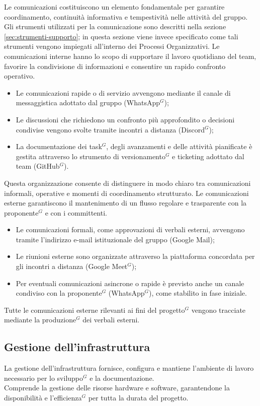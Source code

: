 Le comunicazioni costituiscono un elemento fondamentale per garantire coordinamento, continuità informativa e tempestività nelle attività del gruppo. Gli strumenti utilizzati per la comunicazione sono descritti nella sezione \ref{sec:strumenti-supporto}; in questa sezione viene invece specificato come tali strumenti vengono impiegati all’interno dei Processi Organizzativi.
Le comunicazioni interne hanno lo scopo di supportare il lavoro quotidiano del team, favorire la condivisione di informazioni e consentire un rapido confronto operativo.
\begin{itemize}[itemsep=3pt, parsep=1pt, label=$\scriptstyle\bullet$]
    \item Le comunicazioni rapide o di servizio avvengono mediante il canale di messaggistica adottato dal gruppo (WhatsApp$^G$);
    \item Le discussioni che richiedono un confronto più approfondito o decisioni condivise vengono svolte tramite incontri a distanza (Discord$^G$);
    \item La documentazione dei task$^G$, degli avanzamenti e delle attività pianificate è gestita attraverso lo strumento di versionamento$^G$ e ticketing adottato dal team (GitHub$^G$).
\end{itemize}
Questa organizzazione consente di distinguere in modo chiaro tra comunicazioni informali, operative e momenti di coordinamento strutturato.
Le comunicazioni esterne garantiscono il mantenimento di un flusso regolare e trasparente con la proponente$^G$ e con i committenti.
\begin{itemize}[itemsep=3pt, parsep=1pt, label=$\scriptstyle\bullet$]
    \item Le comunicazioni formali, come approvazioni di verbali esterni, avvengono tramite l’indirizzo e-mail istituzionale del gruppo (Google Mail);
    \item Le riunioni esterne sono organizzate attraverso la piattaforma concordata per gli incontri a distanza (Google Meet$^G$);
    \item Per eventuali comunicazioni asincrone o rapide è previsto anche un canale condiviso con la proponente$^G$ (WhatsApp$^G$), come stabilito in fase iniziale.
\end{itemize}
Tutte le comunicazioni esterne rilevanti ai fini del progetto$^G$ vengono tracciate mediante la produzione$^G$ dei verbali esterni.

\subsection{Gestione dell'infrastruttura}
La gestione dell'infrastruttura fornisce, configura e mantiene l'ambiente di lavoro necessario per lo sviluppo$^G$ e la documentazione.\\
Comprende la gestione delle risorse hardware e software, garantendone la disponibilità e l'efficienza$^G$ per tutta la durata del progetto.
